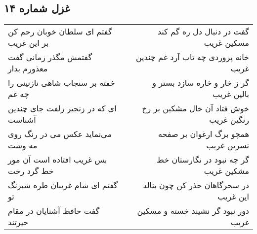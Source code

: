\begin{center}
\section*{غزل شماره ۱۴}
\label{sec:sh014}
\begin{longtable}{l p{0.5cm} r}
گفتم ای سلطان خوبان رحم کن بر این غریب
&&
گفت در دنبال دل ره گم کند مسکین غریب
\\
گفتمش مگذر زمانی گفت معذورم بدار
&&
خانه پروردی چه تاب آرد غم چندین غریب
\\
خفته بر سنجاب شاهی نازنینی را چه غم
&&
گر ز خار و خاره سازد بستر و بالین غریب
\\
ای که در زنجیر زلفت جای چندین آشناست
&&
خوش فتاد آن خال مشکین بر رخ رنگین غریب
\\
می‌نماید عکس می در رنگ روی مه وشت
&&
همچو برگ ارغوان بر صفحه نسرین غریب
\\
بس غریب افتاده است آن مور خط گرد رخت
&&
گر چه نبود در نگارستان خط مشکین غریب
\\
گفتم ای شام غریبان طره شبرنگ تو
&&
در سحرگاهان حذر کن چون بنالد این غریب
\\
گفت حافظ آشنایان در مقام حیرتند
&&
دور نبود گر نشیند خسته و مسکین غریب
\\
\end{longtable}
\end{center}
